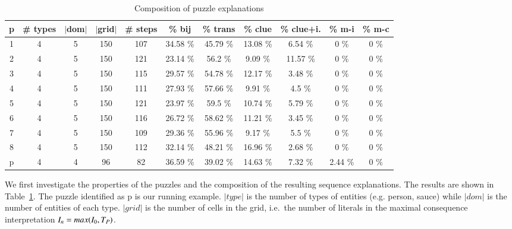\begin{table}
	\centering
\begin{tabular}{c|cccc|cccccc}
     \textbf{p} &  \textbf{\# types} &  \textbf{$|$dom$|$} &  \textbf{$|$grid$|$} &  \textbf{\# steps} &  \textbf{\% bij} &  \textbf{\% trans} &  \textbf{\% clue} & \textbf{\% clue+i.} &   \textbf{\% m-i} &  \textbf{\% m-c} \\
    \hline
         1 &       4 &            5 &         150 &    107 &  34.58 \% &  45.79 \% &        13.08 \% &       6.54 \% &     0 \% &    0 \% \\
    2 &       4 &            5 &         150 &    121 &  23.14 \% &   56.2 \% &         9.09 \% &      11.57 \% &     0 \% &    0 \% \\
    3 &       4 &            5 &         150 &    115 &  29.57 \% &  54.78 \% &        12.17 \% &       3.48 \% &     0 \% &    0 \% \\
    4 &       4 &            5 &         150 &    111 &  27.93 \% &  57.66 \% &         9.91 \% &        4.5 \% &     0 \% &    0 \% \\
    5 &       4 &            5 &         150 &    121 &  23.97 \% &   59.5 \% &        10.74 \% &       5.79 \% &     0 \% &    0 \% \\
    6 &       4 &            5 &         150 &    116 &  26.72 \% &  58.62 \% &        11.21 \% &       3.45 \% &     0 \% &    0 \% \\
    7 &       4 &            5 &         150 &    109 &  29.36 \% &  55.96 \% &         9.17 \% &        5.5 \% &     0 \% &    0 \% \\
    8 &       4 &            5 &         150 &    112 &  32.14 \% &  48.21 \% &        16.96 \% &       2.68 \% &     0 \% &    0 \% \\
    p &       4 &            4 &          96 &     82 &  36.59 \% &  39.02 \% &        14.63 \% &       7.32 \% &  2.44 \% &    0 \%
    \end{tabular}
    \caption{Composition of puzzle explanations}
    \label{table:composition}
    \end{table}

We first investigate the properties of the puzzles and the composition of the resulting sequence explanations. The results are shown in Table~\ref{table:composition}. The puzzle identified as p is our running example. $|type|$ is the number of types of entities (e.g. person, sauce) while $|dom|$ is the number of entities of each type. $|grid|$ is the number of cells in the grid, i.e.\ the number of literals in the maximal consequence interpretation $I_n=max(I_0,T_P)$.


